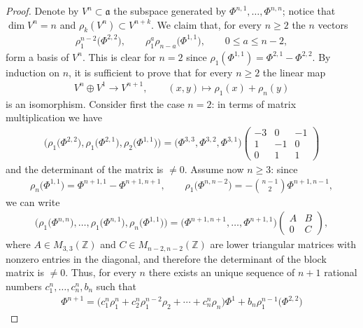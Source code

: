 \documentclass[pdftex]{sigma}
\newcommand{\Z}{\mathbb{Z}}
\numberwithin{equation}{section}
\begin{document}
\begin{proof}Denote by $V^n\subset \mathfrak{a}$ the subspace generated by $\Phi^{n,1},\ldots,\Phi^{n,n}$; notice that $\dim V^n=n$ and
$\rho_k(V^n)\subset V^{n+k}$. We claim that, for every $n\ge 2$ the $n$ vectors
\begin{gather*}\rho_1^{n-2}\big(\Phi^{2,2}\big),\qquad \rho_1^a\rho_{n-a}\big(\Phi^{1,1}\big),\qquad 0\le a\le n-2,\end{gather*}
form a basis of $V^{n}$. This is clear for $n=2$ since $\rho_1(\Phi^{1,1})=\Phi^{2,1}-\Phi^{2,2}$.
By induction on $n$, it is suf\/f\/icient to prove that for every $n\ge 2$ the linear map
\begin{gather*} V^{n}\oplus V^1\to V^{n+1},\qquad (x,y)\mapsto \rho_1(x)+\rho_n(y)\end{gather*}
is an isomorphism. Consider f\/irst the case $n=2$: in terms of matrix multiplication we have
\begin{gather*} \big(\rho_1\big(\Phi^{2,2}\big),\rho_1\big(\Phi^{2,1}\big),\rho_2\big(\Phi^{1,1}\big)\big)=\big(\Phi^{3,3},\Phi^{3,2},\Phi^{3,1}\big)
\begin{pmatrix}-3&0&-1\\
1&-1&0\\
0&1&1\end{pmatrix}\end{gather*}
and the determinant of the matrix is $\not=0$. Assume now $n\ge 3$: since
\begin{gather*} \rho_n\big(\Phi^{1,1}\big)=\Phi^{n+1,1}-\Phi^{n+1,n+1}
,\qquad\rho_1\big(\Phi^{n,n-2}\big)=-\binom{n-1}{2}\Phi^{n+1,n-1},\end{gather*}
we can write
\begin{gather*} \big(\rho_1\big(\Phi^{n,n}\big),\ldots,\rho_1\big(\Phi^{n,1}\big),\rho_n\big(\Phi^{1,1}\big)\big)=
\big(\Phi^{n+1,n+1},\ldots,\Phi^{n+1,1}\big)
\begin{pmatrix}A&B\\
0&C\end{pmatrix},\end{gather*}
where $A\in M_{3,3}(\Z)$ and $C\in M_{n-2,n-2}(\Z)$ are lower triangular matrices with nonzero entries in the diagonal, and therefore the determinant of the block matrix is $\not=0$. Thus, for every $n$ there exists an unique sequence of $n+1$ rational numbers $c^n_1,\ldots,c^n_n,b_n$ such that
\begin{gather*}\Phi^{n+1}=\big(c^n_1\rho_1^n+c^n_2\rho_1^{n-2}\rho_2+\cdots+c^n_n\rho_n\big)\Phi^1+
b_n\rho_1^{n-1}\big(\Phi^{2,2}\big)\end{gather*}

\end{proof}
\end{document}
